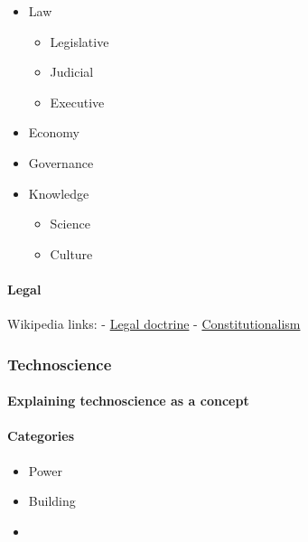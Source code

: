 \documentclass[]{article}
\begin{document}
\begin{itemize}
\itemsep1pt\parskip0pt
\item
  Law

  \begin{itemize}
  \itemsep1pt\parskip0pt
  \item
    Legislative
  \item
    Judicial
  \item
    Executive
  \end{itemize}
\item
  Economy
\item
  Governance
\item
  Knowledge

  \begin{itemize}
  \itemsep1pt\parskip0pt
  \item
    Science
  \item
    Culture
  \end{itemize}
\end{itemize}

\paragraph{Legal}\label{legal}

Wikipedia links: -
\href{http://en.wikipedia.org/wiki/Legal_doctrine}{Legal doctrine} -
\href{http://en.wikipedia.org/wiki/Constitutionalism}{Constitutionalism}

\subsubsection{Technoscience}\label{technoscience}

\paragraph{Explaining technoscience as a
concept}\label{explaining-technoscience-as-a-concept}

\paragraph{Categories}\label{categories}

\begin{itemize}
\item
  Power
\item
  Building
\item
\end{itemize}
\end{document}
